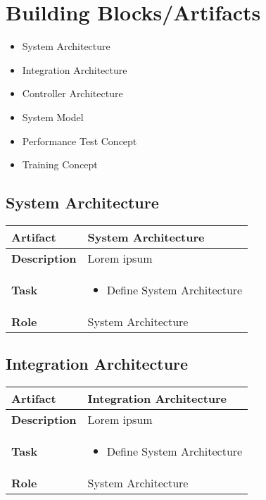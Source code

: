 \section{Building Blocks/Artifacts}

\begin{itemize}
	\item System Architecture
	\item Integration Architecture
	\item Controller Architecture
	\item System Model
	\item Performance Test Concept
	\item Training Concept
\end{itemize}

\subsection{System Architecture}
 \label{table:ch6_Artifact_System_Architecture}
\begin{tabular}
	{|m{2cm}|m{10cm}|} \hline \bfseries Artifact & System Architecture\\
	\hline \bfseries Description & Lorem ipsum\\
	\hline \bfseries Task & 
	\begin{itemize}
		\item Define System Architecture 
	\end{itemize}
	\\
	\hline \bfseries Role & System Architecture\\
	\hline 
\end{tabular}

\subsection{Integration Architecture}
 \label{table:ch6_Artifact_Integration_Architecture}
\begin{tabular}
	{|m{2cm}|m{10cm}|} \hline \bfseries Artifact & Integration Architecture\\
	\hline \bfseries Description & Lorem ipsum\\
	\hline \bfseries Task & 
	\begin{itemize}
		\item Define System Architecture 
	\end{itemize}
	\\
	\hline \bfseries Role & System Architecture\\
	\hline 
\end{tabular}

